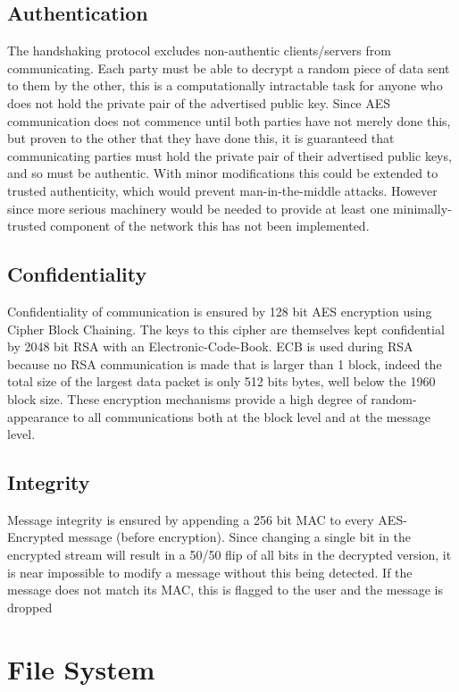 \subsection{Authentication}
The handshaking protocol excludes non-authentic clients/servers from communicating.
Each party must be able to decrypt a random piece of data sent to them by the other, this is a computationally intractable task for anyone who does not hold the private pair of the advertised public key.
Since AES communication does not commence until both parties have not merely done this, but proven to the other that they have done this, it is guaranteed that communicating parties must hold the private pair of their advertised public keys, and so must be authentic.
With minor modifications this could be extended to trusted authenticity, which would prevent man-in-the-middle attacks.
However since more serious machinery would be needed to provide at least one minimally-trusted component of the network this has not been implemented.

\subsection{Confidentiality}
Confidentiality of communication is ensured by 128 bit AES encryption using Cipher Block Chaining.
The keys to this cipher are themselves kept confidential by 2048 bit RSA with an Electronic-Code-Book.
ECB is used during RSA because no RSA communication is made that is larger than 1 block, indeed the total size of the largest data packet is only 512 bits bytes, well below the 1960 block size.
These encryption mechanisms provide a high degree of random-appearance to all communications both at the block level and at the message level.

\subsection{Integrity}
Message integrity is ensured by appending a 256 bit MAC to every AES-Encrypted message (before encryption).
Since changing a single bit in the encrypted stream will result in a 50/50 flip of all bits in the decrypted version, it is near impossible to modify a message without this being detected.
If the message does not match its MAC, this is flagged to the user and the message is dropped

\section{File System}

